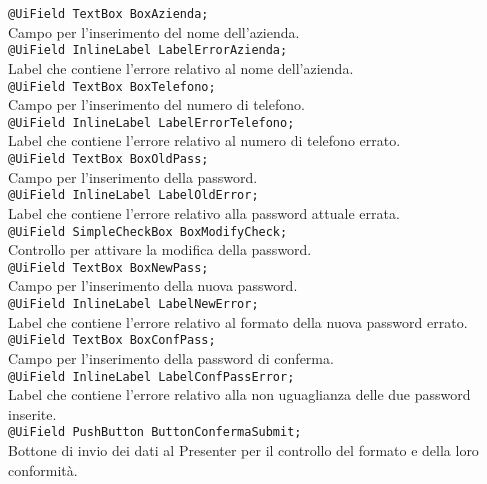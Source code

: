 {\begin{sloppypar}
{{\begin{itemize}
				\texttt{@UiField TextBox BoxAzienda;}\\
				Campo per l'inserimento del nome dell'azienda.\\

				\texttt{@UiField InlineLabel LabelErrorAzienda;}\\
				Label che contiene l'errore relativo al nome dell'azienda.\\
				
				\texttt{@UiField TextBox BoxTelefono;}\\
				Campo per l'inserimento del numero di telefono.\\

				\texttt{@UiField InlineLabel LabelErrorTelefono;}\\
				Label che contiene l'errore relativo al numero di telefono errato.\\

				\texttt{@UiField TextBox BoxOldPass;}\\
				Campo per l'inserimento della password.\\

				\texttt{@UiField InlineLabel LabelOldError;}\\
				Label che contiene l'errore relativo alla password attuale errata.\\

				\texttt{@UiField SimpleCheckBox BoxModifyCheck;}\\
				Controllo per attivare la modifica della password.\\

				\texttt{@UiField TextBox BoxNewPass;}\\
				Campo per l'inserimento della nuova password.\\

				\texttt{@UiField InlineLabel LabelNewError;}\\
				Label che contiene l'errore relativo al formato della nuova password errato.\\

				\texttt{@UiField TextBox BoxConfPass;}\\
				Campo per l'inserimento della password di conferma.\\

				\texttt{@UiField InlineLabel LabelConfPassError;}\\
				Label che contiene l'errore relativo alla non uguaglianza delle due password inserite.\\

				\texttt{@UiField PushButton ButtonConfermaSubmit;}\\
				Bottone di invio dei dati al Presenter per il controllo del formato e della loro conformità.\\


\end{itemize}}}
\end{sloppypar}}
